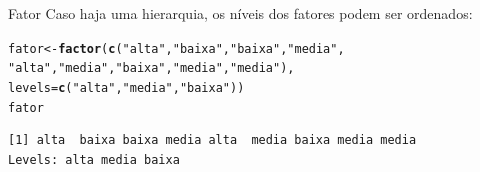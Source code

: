 \documentclass[10pt,handout]{beamer}\usepackage[]{graphicx}\usepackage[]{color}
\makeatletter
\newcommand{\hlstr}[1]{\textcolor[rgb]{0.282,0.239,0.545}{#1}}%
\newcommand{\hlstd}[1]{\textcolor[rgb]{0.345,0.345,0.345}{#1}}%
\newcommand{\hlkwb}[1]{\textcolor[rgb]{0.69,0.353,0.396}{#1}}%
\newcommand{\hlkwc}[1]{\textcolor[rgb]{0.333,0.667,0.333}{#1}}%
\newcommand{\hlkwd}[1]{\textcolor[rgb]{0.282,0.239,0.545}{\textbf{#1}}}%
\newenvironment{kframe}{%
 \def\at@end@of@kframe{}%
 \ifinner\ifhmode%
  \def\at@end@of@kframe{\end{minipage}}%
  \begin{minipage}{\columnwidth}%
 \fi\fi%
 \def\FrameCommand##1{\hskip\@totalleftmargin \hskip-\fboxsep
 \colorbox{shadecolor}{##1}\hskip-\fboxsep
     \hskip-\linewidth \hskip-\@totalleftmargin \hskip\columnwidth}%
 \MakeFramed {\advance\hsize-\width
   \@totalleftmargin\z@ \linewidth\hsize
   \@setminipage}}%
 {\par\unskip\endMakeFramed%
 \at@end@of@kframe}
\newenvironment{knitrout}{}{} %
\makeatother
\begin{document}
\begin{frame}[fragile]{Fator}
Caso haja uma hierarquia, os níveis dos fatores podem ser ordenados:
\begin{knitrout}\small
{}\color{fgcolor}\begin{kframe}
\begin{alltt}
\hlstd{fator} \hlkwb{<-} \hlkwd{factor}\hlstd{(}\hlkwd{c}\hlstd{(}\hlstr{"alta"}\hlstd{,}\hlstr{"baixa"}\hlstd{,}\hlstr{"baixa"}\hlstd{,}\hlstr{"media"}\hlstd{,}
                  \hlstr{"alta"}\hlstd{,}\hlstr{"media"}\hlstd{,}\hlstr{"baixa"}\hlstd{,}\hlstr{"media"}\hlstd{,}\hlstr{"media"}\hlstd{),}
                \hlkwc{levels} \hlstd{=} \hlkwd{c}\hlstd{(}\hlstr{"alta"}\hlstd{,}\hlstr{"media"}\hlstd{,}\hlstr{"baixa"}\hlstd{))}
\hlstd{fator}
\end{alltt}
\begin{verbatim}
[1] alta  baixa baixa media alta  media baixa media media
Levels: alta media baixa
\end{verbatim}
\end{kframe}
\end{knitrout}

\end{frame}

\end{document}
